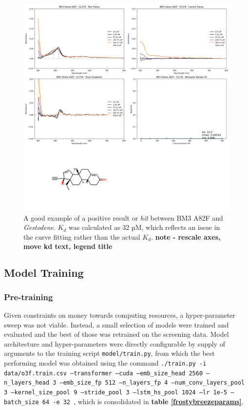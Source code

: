 \documentclass{article}
\begin{document}
\begin{figure}
	\caption{\label{screeninghit} A good example of a positive result or \textit{hit} between BM3 A82F and \textit{Gestodene}. $K_d$ was calculated as 32 µM, which reflects an issue in the curve fitting rather than the actual $K_d$. \textbf{note - rescale axes, move kd text, legend title}}
	\includegraphics[width = \textwidth]{img/BM3-Heme-A82F:S1376.png}
\end{figure}

\subsection{Model Training}

\subsubsection{Pre-training}

Given constraints on money towards computing resources, a hyper-parameter sweep was not viable.
Instead, a small selection of models were trained and evaluated and the best of those was retrained on the screening data.
Model architecture and hyper-parameters were directly configurable by supply of arguments to the training script \texttt{model/train.py}, from which the best performing model was obtained using the command \texttt{./train.py -i data/o3f.train.csv --transformer --cuda --emb\_size\_head 2560 --n\_layers\_head 3 --emb\_size\_fp 512 --n\_layers\_fp 4 --num\_conv\_layers\_pool 3 --kernel\_size\_pool 9 --stride\_pool 3 --lstm\_hs\_pool 1024 --lr 1e-5 --batch\_size 64 -e 32
}, which is consolidated in \textbf{table \ref{frostybreezeparams}}.
\end{document}

